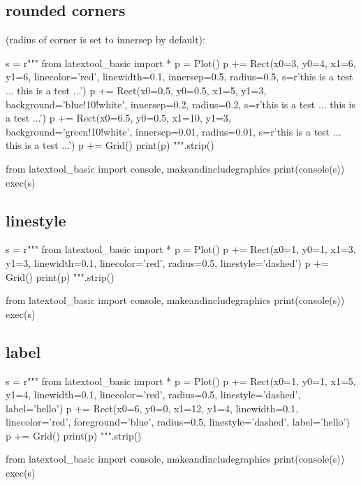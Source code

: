 \newpage
\subsection{rounded corners}
(radius of corner is set to innersep by default):
\begin{python}
s = r"""
from latextool_basic import *
p = Plot()
p += Rect(x0=3, y0=4, x1=6, y1=6, linecolor='red', linewidth=0.1,
          innersep=0.5, radius=0.5, 
          s=r'{\tiny this is a test ... this is a test ...}')
p += Rect(x0=0.5, y0=0.5, x1=5, y1=3, 
          background='blue!10!white', 
          innersep=0.2, radius=0.2,
          s=r'{\tiny this is a test ... this is a test ...}')
p += Rect(x0=6.5, y0=0.5, x1=10, y1=3, 
          background='green!10!white', 
          innersep=0.01, radius=0.01,
          s=r'{\tiny this is a test ... this is a test ...}')
p += Grid()
print(p)
""".strip()

from latextool_basic import console, makeandincludegraphics
print(console(s))
exec(s)
\end{python}


\newpage
\subsection{linestyle}
\begin{python}
s = r"""
from latextool_basic import *
p = Plot()
p += Rect(x0=1, y0=1, x1=3, y1=3,
          linewidth=0.1, linecolor='red',
          radius=0.5, linestyle='dashed')
p += Grid()
print(p)
""".strip()

from latextool_basic import console, makeandincludegraphics
print(console(s))
exec(s)
\end{python}


\newpage
\subsection{label}
\begin{python}
s = r"""
from latextool_basic import *
p = Plot()
p += Rect(x0=1, y0=1, x1=5, y1=4,
          linewidth=0.1, linecolor='red',
          radius=0.5, linestyle='dashed', label='hello')
p += Rect(x0=6, y0=0, x1=12, y1=4,
          linewidth=0.1, linecolor='red',
          foreground='blue',
          radius=0.5, linestyle='dashed', label='hello')
p += Grid()
print(p)
""".strip()

from latextool_basic import console, makeandincludegraphics
print(console(s))
exec(s)
\end{python}



